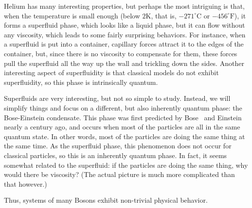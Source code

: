 \documentclass{ian}
\begin{document}
\point
Helium has many interesting properties, but perhaps the most intriguing is that, when the temperature is small enough (below $2\mathrm{K}$, that is, $-271^\circ\mathrm{C}$ or $-456^\circ\mathrm{F}$), it forms a superfluid phase, which looks like a liquid phase, but it can flow without any viscosity, which leads to some fairly surprising behaviors.
For instance, when a superfluid is put into a container, capillary forces attract it to the edges of the container, but, since there is no viscosity to compensate for them, these forces pull the superfluid all the way up the wall and trickling down the sides.
Another interesting aspect of superfluidity is that classical models do not exhibit superfluidity, so this phase is intrinsically quantum.
\bigskip

\indent
Superfluids are very interesting, but not so simple to study.
Instead, we will simplify things and focus on a different, but also inherently quantum phase: the Bose-Einstein condensate.
This phase was first predicted by Bose\-~\cite{Bo24} and Einstein\-~\cite{Ei24} nearly a century ago, and occurs when most of the particles are all in the same quantum state.
In other words, most of the particles are doing the same thing at the same time.
As the superfluid phase, this phenomenon does not occur for classical particles, so this is an inherently quantum phase.
In fact, it seems somewhat related to the superfluid: if the particles are doing the same thing, why would there be viscosity?
(The actual picture is much more complicated than that however.)
\bigskip

\indent
Thus, systems of many Bosons exhibit non-trivial physical behavior.
\bigskip
\end{document}
